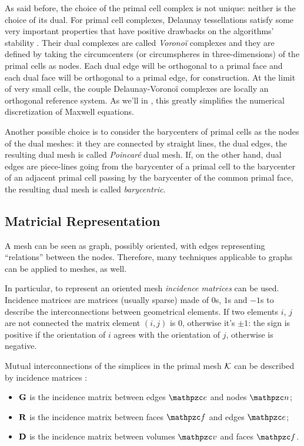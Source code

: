 As said before, the choice of the primal cell complex is not unique:
neither is the choice of its dual. For primal cell complexes, Delaunay
tessellations satisfy some very important properties that have
positive drawbacks on the algorithms'
stability \cite{cavendish_complementary}. Their dual complexes are
called \emph{Vorono\"i} complexes and they are defined by taking the
circumcenters (or circumspheres in three-dimensions) of the primal
cells as nodes. Each dual edge will be orthogonal to a primal face and
each dual face will be orthogonal to a primal edge, for
construction. At the limit of very small cells, the couple
Delaunay-Vorono\"i complexes are locally an orthogonal reference
system. As we'll in , this greatly simplifies the
numerical discretization of Maxwell equations.

Another possible choice is to consider the barycenters of primal cells
as the nodes of the dual meshes: it they are connected by straight
lines, the dual edges, the resulting dual mesh is called
\emph{Poincar\'e} dual mesh. If, on the other hand, dual edges are
piece-lines going from the barycenter of a primal cell to the
barycenter of an adjacent primal cell passing by the barycenter of the
common primal face, the resulting dual mesh is called
\emph{barycentric}.

\subsection{Matricial Representation} \label{sec:mesh:matricial}

A mesh can be seen as graph, possibly oriented, with edges representing
``relations'' between the nodes. Therefore, many techniques applicable
to graphs can be applied to meshes, as well.

In particular, to represent an oriented mesh \emph{incidence matrices}
can be used. Incidence matrices are matrices (usually sparse) made of
$0$s, $1$s and $-1$s to describe the interconnections between
geometrical elements. If two elements $i$, $j$ are not connected the
matrix element $(i,j)$ is $0$, otherwise it's $\pm 1$: the sign
is positive if the orientation of $i$ agrees with the orientation of
$j$, otherwise is negative.

Mutual interconnections of the simplices in the primal mesh $\mathcal{K}$
can be described by incidence matrices \cite{trevisan_geometric}:
\begin{itemize}
\item
  $\mathbf{G}$ is the incidence matrix between edges $\Line{e}$ and
  nodes $\Point{n}$;  
\item
  $\mathbf{R}$ is the incidence matrix between faces $\Surface{f}$ and
  edges $\Line{e}$;  
\item
  $\mathbf{D}$ is the incidence matrix between volumes $\Volume{v}$
  and faces $\Surface{f}$.  
\end{itemize}

